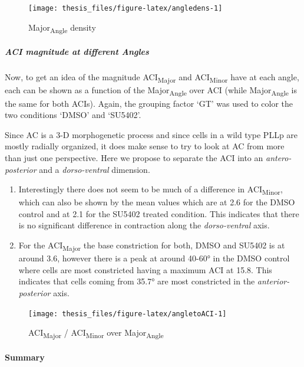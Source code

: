 \documentclass[11pt,singlespacinge,twoside]{reedthesis} %
\def\labelenumi{\arabic{enumi}.}
\begin{document}
\begin{figure}

{\centering \texttt{[image: thesis\_files/figure-latex/angledens-1]} 

}

\caption{Major\textsubscript{Angle} density}\label{fig:angledens}
\end{figure}
\hypertarget{ACI-mag}{%
\subparagraph{ACI magnitude at different Angles}\label{ACI-mag}}

Now, to get an idea of the magnitude ACI\textsubscript{Major} and ACI\textsubscript{Minor} have at each angle, each can be shown as a function of the Major\textsubscript{Angle} over ACI (while Major\textsubscript{Angle} is the same for both ACIs). Again, the grouping factor `GT' was used to color the two conditions `DMSO' and `SU5402'.

\noindent Since AC is a 3-D morphogenetic process and since cells in a wild type PLLp are mostly radially organized, it does make sense to try to look at AC from more than just one perspective. Here we propose to separate the ACI into an \emph{antero-posterior} and a \emph{dorso-ventral} dimension.
\begin{enumerate}
\def\labelenumi{\arabic{enumi}.}
\item
  Interestingly there does not seem to be much of a difference in ACI\textsubscript{Minor}, which can also be shown by the mean values which are at 2.6 for the DMSO control and at 2.1 for the SU5402 treated condition. This indicates that there is no significant difference in contraction along the \emph{dorso-ventral} axis.
\item
  For the ACI\textsubscript{Major} the base constriction for both, DMSO and SU5402 is at around 3.6, however there is a peak at around 40-60° in the DMSO control where cells are most constricted having a maximum ACI at 15.8. This indicates that cells coming from 35.7° are most constricted in the \emph{anterior-posterior} axis.
\end{enumerate}

\begin{figure}

{\centering \texttt{[image: thesis\_files/figure-latex/angletoACI-1]} 

}

\caption{ACI\textsubscript{Major} / ACI\textsubscript{Minor} over Major\textsubscript{Angle}}\label{fig:angletoACI}
\end{figure}
\hypertarget{summary-3}{%
\paragraph{Summary}\label{summary-3}}
\end{document}
